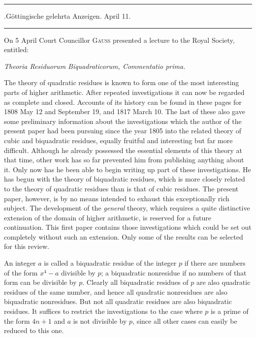 \clearpage
{}%
\begin{center}
\rule{.82\linewidth}{.35pt}\par
.Göttingische gelehrta Anzeigen. April 11.\par
\rule{.82\linewidth}{.35pt}
\end{center}
On 5 April Court Councillor \textsc{Gauss} presented a lecture to the Royal Society, entitled:
\begin{center}\itshape
Theoria Residuorum Biquadraticorum, Commentatio prima.
\end{center}

The theory of quadratic residues is known to form one of the most interesting parts of higher arithmetic. After repeated investigations it can now be regarded as complete and closed. Accounts of its history can be found in these pages for 1808 May 12 and September 19, and 1817 March 10. The last of these also gave some preliminary information about the investigations which the author of the present paper had been pursuing since the year 1805 into the related theory of cubic and biquadratic residues, equally fruitful and interesting but far more difficult. Although he already possessed the essential elements of this theory at that time, other work has so far prevented him from publishing anything about it. Only now has he been able to begin writing up part of these investigations. He has begun with the theory of biquadratic residues, which is more closely related to the theory of quadratic residues than is that of cubic residues. The present paper, however, is
%
by no means intended to exhaust this exceptionally rich subject. The development of the \emph{general} theory, which requires a quite distinctive extension of the domain of higher arithmetic, is reserved for a future continuation. This first paper contains those investigations which could be set out completely without such an extension. Only some of the results can be selected for this review.

An integer $a$ is called a biquadratic residue of the integer $p$ if there are numbers of the form $x^4-a$ divisible by $p$; a biquadratic nonresidue if no numbers of that form can be divisible by $p$. Clearly all biquadratic residues of $p$ are also quadratic residues of the same number, and hence all quadratic nonresidues are also biquadratic nonresidues. But not all quadratic residues are also biquadratic residues. It suffices to restrict the investigations to the case where $p$ is a prime of the form $4n+1$ and $a$ is not divisible by $p$, since all other cases can easily be reduced to this one.


